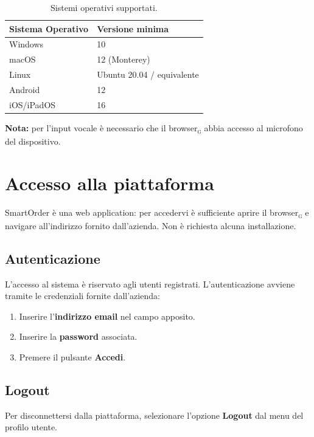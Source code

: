 \documentclass[a4paper, 11pt, oneside]{scrartcl}
\begin{document}
\begin{table}[H]
    \centering
    \renewcommand{\arraystretch}{1.2}
    \begin{tabular}{ll}
        \toprule
        \textbf{Sistema Operativo} & \textbf{Versione minima} \\
        \midrule
        Windows    & 10 \\
        macOS      & 12 (Monterey) \\
        Linux      & Ubuntu 20.04 / equivalente \\
        Android    & 12 \\
        iOS/iPadOS & 16 \\
        \bottomrule
    \end{tabular}
    \caption{Sistemi operativi supportati.}
    \label{tab:req-os}
\end{table}

\textbf{Nota:} per l'input vocale \`e necessario che il browser\textsubscript{\textsc{g}} abbia accesso al microfono del dispositivo.

\newpage
\section{Accesso alla piattaforma}
SmartOrder \`e una web application: per accedervi \`e sufficiente aprire il browser\textsubscript{\textsc{g}} e navigare all'indirizzo fornito dall'azienda. Non \`e richiesta alcuna installazione.

\subsection{Autenticazione}
L'accesso al sistema \`e riservato agli utenti registrati. L'autenticazione avviene tramite le credenziali fornite dall'azienda:

\begin{enumerate}[noitemsep]
    \item Inserire l'\textbf{indirizzo email} nel campo apposito.
    \item Inserire la \textbf{password} associata.
    \item Premere il pulsante \textbf{Accedi}.
\end{enumerate}

\subsection{Logout}
Per disconnettersi dalla piattaforma, selezionare l'opzione \textbf{Logout} dal menu del profilo utente.
\end{document}
